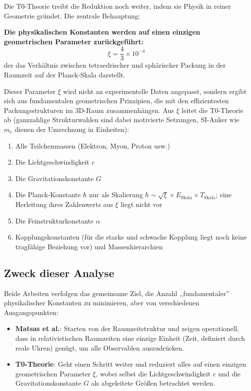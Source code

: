 	Die T0-Theorie treibt die Reduktion noch weiter, indem sie Physik in reiner Geometrie gründet. Die zentrale Behauptung:
	
	\begin{keyresult}
		\textbf{Die physikalischen Konstanten werden auf einen einzigen geometrischen Parameter zurückgeführt:}
		\[
		\xi = \frac{4}{3} \times 10^{-4}
		\]
		der das Verhältnis zwischen tetraedrischer und sphärischer Packung in der Raumzeit auf der Planck-Skala darstellt.
	\end{keyresult}
	
	Dieser Parameter $\xi$ wird nicht an experimentelle Daten angepasst, sondern ergibt sich aus fundamentalen geometrischen Prinzipien, die mit den effizientesten Packungsstrukturen im 3D-Raum zusammenhängen. Aus $\xi$ leitet die T0-Theorie ab (ganzzahlige Strukturwahlen sind dabei motivierte Setzungen, SI-Anker wie $m_e$ dienen der Umrechnung in Einheiten):
	
	\begin{enumerate}
		\item Alle Teilchenmassen (Elektron, Myon, Proton usw.)
		\item Die Lichtgeschwindigkeit $c$
		\item Die Gravitationskonstante $G$
		\item Die Planck-Konstante $\hbar$ nur als Skalierung $\hbar \sim \sqrt{\xi} \times E_{\text{Skala}} \times T_{\text{Skala}}$; eine Herleitung ihres Zahlenwerts aus $\xi$ liegt nicht vor
		\item Die Feinstrukturkonstante $\alpha$
		\item Kopplungskonstanten (für die starke und schwache Kopplung liegt noch keine tragfähige Beziehung vor) und Massenhierarchien
	\end{enumerate}
	
	\subsection{Zweck dieser Analyse}
	
	Beide Arbeiten verfolgen das gemeinsame Ziel, die Anzahl ,,fundamentaler'' physikalischer Konstanten zu minimieren, aber von verschiedenen Ausgangspunkten:
	
	\begin{itemize}
		\item \textbf{Matsas et al.}: Starten von der Raumzeitstruktur und zeigen operationell, dass in relativistischen Raumzeiten eine einzige Einheit (Zeit, definiert durch reale Uhren) genügt, um alle Observablen auszudrücken.
		
		\item \textbf{T0-Theorie}: Geht einen Schritt weiter und reduziert alles auf einen einzigen geometrischen Parameter $\xi$, wobei selbst die Lichtgeschwindigkeit $c$ und die Gravitationskonstante $G$ als abgeleitete Größen betrachtet werden.
	\end{itemize}
	
